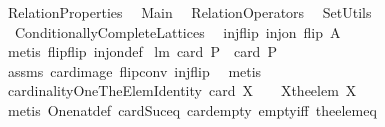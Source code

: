%
\begin{isabellebody}%
\def\isabellecontext{RelationProperties}%
%
\isamarkuptrue%
%
\isadelimtheory
%
\endisadelimtheory
%
\isatagtheory
{}\isamarkupfalse%
\ RelationProperties\isanewline
{}\isanewline
\ \ Main\isanewline
\ \ RelationOperators\isanewline
\ \ SetUtils\isanewline
\ \ Conditionally{\isacharunderscore}Complete{\isacharunderscore}Lattices\ \isanewline
\isanewline
{}%
\endisatagtheory
{\isafoldtheory}%
%
\isadelimtheory
%
\endisadelimtheory
%
\isamarkuptrue%
\isamarkupfalse%
\ injflip{\isacharcolon}\ {\isachardoublequoteopen}inj{\isacharunderscore}on\ flip\ A{\isachardoublequoteclose}\ \isanewline
%
\isadelimproof
\ \ %
\endisadelimproof
%
\isatagproof
{}\isamarkupfalse%
\ {\isacharparenleft}metis\ flip{\isacharunderscore}flip\ inj{\isacharunderscore}on{\isacharunderscore}def{\isacharparenright}%
\endisatagproof
{\isafoldproof}%
%
\isadelimproof
\isanewline
%
\endisadelimproof
\isanewline
{}\isamarkupfalse%
\ lm{}{}{\isacharcolon}\ {\isachardoublequoteopen}card\ P\ {\isacharequal}\ card\ {\isacharparenleft}P{\isacharcircum}{\isacharminus}{}{\isacharparenright}{\isachardoublequoteclose}\ \isanewline
%
\isadelimproof
\ \ %
\endisadelimproof
%
\isatagproof
{}\isamarkupfalse%
\ assms\ card{\isacharunderscore}image\ flip{\isacharunderscore}conv\ injflip\ \isamarkupfalse%
\ metis%
\endisatagproof
{\isafoldproof}%
%
\isadelimproof
\isanewline
%
\endisadelimproof
\isanewline
{}\isamarkupfalse%
\ cardinalityOneTheElemIdentity{\isacharcolon}\ {\isachardoublequoteopen}{\isacharparenleft}card\ X\ {\isacharequal}\ {}{\isacharparenright}\ {\isacharequal}\ {\isacharparenleft}X{\isacharequal}{\isacharbraceleft}the{\isacharunderscore}elem\ X{\isacharbraceright}{\isacharparenright}{\isachardoublequoteclose}\ \isanewline
%
\isadelimproof
\ \ %
\endisadelimproof
%
\isatagproof
{}\isamarkupfalse%
\ {\isacharparenleft}metis\ One{\isacharunderscore}nat{\isacharunderscore}def\ card{\isacharunderscore}Suc{\isacharunderscore}eq\ card{\isacharunderscore}empty\ empty{\isacharunderscore}iff\ the{\isacharunderscore}elem{\isacharunderscore}eq{\isacharparenright}%
\endisatagproof
{\isafoldproof}%
%
\isadelimproof
\isanewline
%
\endisadelimproof
\isanewline
{}\isamarkupfalse%

\end{isabellebody}
